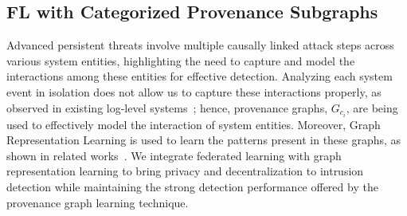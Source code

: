 \subsection{FL with Categorized Provenance Subgraphs}
\label{sys:fpgl}



Advanced persistent threats involve multiple causally linked attack steps across various system entities, highlighting the need to capture and model the interactions among these entities for effective detection. Analyzing each system event in isolation does not allow us to capture these interactions properly, as observed in existing log-level systems~\cite{deeplog2017,liu2019log2vec,xia2019loggan}; hence, provenance graphs, \( G_{c_i} \), are being used to effectively model the interaction of system entities. Moreover, Graph Representation Learning is used to learn the patterns present in these graphs, as shown in related works~\cite{flash2024,cheng2023kairos,jia2023magic}. We integrate federated learning with graph representation learning to bring privacy and decentralization to intrusion detection while maintaining the strong detection performance offered by the provenance graph learning technique.

